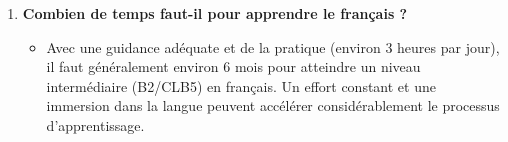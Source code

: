 \documentclass[
  16pt,
  letterpaper,
  DIV=11,
  numbers=noendperiod]{scrartcl}
\providecommand{\tightlist}{%
  \setlength{\itemsep}{0pt}\setlength{\parskip}{0pt}}\usepackage{longtable,booktabs,array}
\begin{document}
\begin{enumerate}
\def\labelenumi{\arabic{enumi}.}
\setcounter{enumi}{14}
\tightlist
\item
  \textbf{Combien de temps faut-il pour apprendre le français ?}

  \begin{itemize}
  \tightlist
  \item
    Avec une guidance adéquate et de la pratique (environ 3 heures par
    jour), il faut généralement environ 6 mois pour atteindre un niveau
    intermédiaire (B2/CLB5) en français. Un effort constant et une
    immersion dans la langue peuvent accélérer considérablement le
    processus d'apprentissage.
  \end{itemize}
\end{enumerate}
\end{document}
